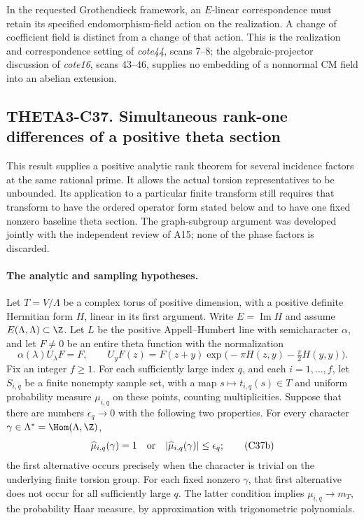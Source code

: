 \documentclass[11pt]{article}
\theoremstyle{definition}\newtheorem{definition}[theorem]{Definition}\newtheorem{remark}[theorem]{Remark}
\begin{document}
In the requested Grothendieck framework, an
$E$-linear correspondence must retain its specified
endomorphism-field action on the realization. A
change of coefficient field is distinct from a
change of that action. This is the realization and
correspondence setting of \emph{cote44}, scans 7--8;
the algebraic-projector discussion of \emph{cote16},
scans 43--46, supplies no embedding of a nonnormal
CM field into an abelian extension.


\subsection{THETA3-C37. Simultaneous rank-one differences of a positive theta section}
\label{C37}

This result supplies a positive analytic rank theorem for several
incidence factors at the same rational prime.  It allows the actual
torsion representatives to be unbounded.  Its application to a particular
finite transform still requires that transform to have the ordered
operator form stated below and to have one fixed nonzero baseline theta
section.  The graph-subgroup argument was developed jointly with the
independent review of A15; none of the phase factors is discarded.

\paragraph{The analytic and sampling hypotheses.}
Let $T=V/\Lambda$ be a complex torus of positive dimension, with a
positive definite Hermitian form $H$, linear in its first argument.
Write $E=\operatorname{Im}H$ and assume $E(\Lambda,\Lambda)\subset\Z$.
Let $L$ be the positive Appell--Humbert line with semicharacter
$\alpha$, and let $F\ne0$ be an entire theta function with the
normalization
\[
 \alpha(\lambda)U_\lambda F=F,
 \qquad
 U_yF(z)=F(z+y)
       \exp\bigl(-\pi H(z,y)-\tfrac\pi2H(y,y)\bigr).
 \tag{C37a}
\]
Fix an integer $f\ge1$.  For each sufficiently large index $q$, and
each $i=1,\ldots,f$, let $S_{i,q}$ be a finite nonempty sample set,
with a map $s\mapsto t_{i,q}(s)\in T$ and uniform probability measure
$\mu_{i,q}$ on these points, counting multiplicities.  Suppose that
there are numbers $\epsilon_q\to0$ with the following two properties.
For every character $\gamma\in\Lambda^*=\Hom(\Lambda,\Z)$,
\[
 \widehat\mu_{i,q}(\gamma)=1
 \quad\hbox{or}\quad
 |\widehat\mu_{i,q}(\gamma)|\le\epsilon_q;
 \tag{C37b}
\]
the first alternative occurs precisely when the character is trivial
on the underlying finite torsion group.  For each fixed nonzero
$\gamma$, that first alternative does not occur for all sufficiently
large $q$.  The latter condition implies
$\mu_{i,q}\to m_T$, the probability Haar measure, by approximation
with trigonometric polynomials.
\end{document}
